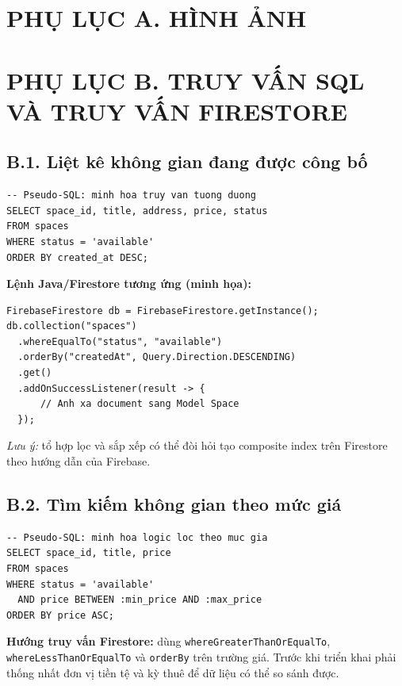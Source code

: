 \clearpage
\pagestyle{plain}
\setcounter{table}{0}
\section*{PHỤ LỤC A. HÌNH ẢNH}
\setcounter{figure}{0}
\printappendixfigures
\clearpage


\clearpage
\section*{PHỤ LỤC B. TRUY VẤN SQL VÀ TRUY VẤN FIRESTORE}
\subsection*{B.1. Liệt kê không gian đang được công bố}
\begin{verbatim}
-- Pseudo-SQL: minh hoa truy van tuong duong
SELECT space_id, title, address, price, status
FROM spaces
WHERE status = 'available'
ORDER BY created_at DESC;
\end{verbatim}
\noindent\textbf{Lệnh Java/Firestore tương ứng (minh họa):}
\begin{verbatim}
FirebaseFirestore db = FirebaseFirestore.getInstance();
db.collection("spaces")
  .whereEqualTo("status", "available")
  .orderBy("createdAt", Query.Direction.DESCENDING)
  .get()
  .addOnSuccessListener(result -> {
      // Anh xa document sang Model Space
  });
\end{verbatim}
\noindent\textit{Lưu ý:} tổ hợp lọc và sắp xếp có thể đòi hỏi tạo composite index trên Firestore theo hướng dẫn của Firebase.

\subsection*{B.2. Tìm kiếm không gian theo mức giá}
\begin{verbatim}
-- Pseudo-SQL: minh hoa logic loc theo muc gia
SELECT space_id, title, price
FROM spaces
WHERE status = 'available'
  AND price BETWEEN :min_price AND :max_price
ORDER BY price ASC;
\end{verbatim}
\noindent\textbf{Hướng truy vấn Firestore:} dùng \texttt{whereGreaterThanOrEqualTo}, \texttt{whereLessThanOrEqualTo} và \texttt{orderBy} trên trường giá. Trước khi triển khai phải thống nhất đơn vị tiền tệ và kỳ thuê để dữ liệu có thể so sánh được.

